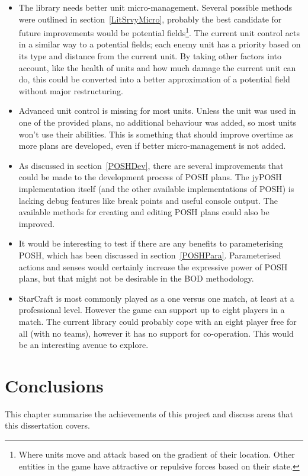 \documentclass[11pt,openright,a4paper]{report}
\begin{document}
\begin{itemize}
\item{The library needs better unit micro-management. Several possible methods were outlined in section~\ref{LitSrvyMicro}, probably the best candidate for future improvements would be potential fields\footnote{Where units move and attack based on the gradient of their location. Other entities in the game have attractive or repulsive forces based on their state.}. The current unit control acts in a similar way to a potential fields; each enemy unit has a priority based on its type and distance from the current unit. By taking other factors into account, like the health of units and how much damage the current unit can do, this could be converted into a better approximation of a potential field without major restructuring.}
\item{Advanced unit control is missing for most units. Unless the unit was used in one of the provided plans, no additional behaviour was added, so most units won't use their abilities. This is something that should improve overtime as more plans are developed, even if better micro-management is not added.}
\item{As discussed in section~\ref{POSHDev}, there are several improvements that could be made to the development process of POSH plans. The jyPOSH implementation itself (and the other available implementations of POSH) is lacking debug features like break points and useful console output. The available methods for creating and editing POSH plans could also be improved.}
\item{It would be interesting to test if there are any benefits to parameterising POSH, which has been discussed in section~\ref{POSHPara}. Parameterised actions and senses would certainly increase the expressive power of POSH plans, but that might not be desirable in the BOD methodology.}
\item{StarCraft is most commonly played as a one versus one match, at least at a professional level. However the game can support up to eight players in a match. The current library could probably cope with an eight player free for all (with no teams), however it has no support for co-operation. This would be an interesting avenue to explore.}
\end{itemize}

\chapter{Conclusions}
This chapter summarise the achievements of this project and discuss areas that this dissertation covers.
\end{document}
